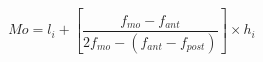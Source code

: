 \begin{equation}\label{}
    Mo=l_{i}+\left[\frac{f_{mo}-f_{ant}}{2f_{mo}-(f_{ant}-f_{post})}\right]\times h_{i}
\end{equation}








